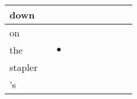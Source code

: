 \documentclass[landscape]{article}
\newcommand{\ssp}{\hspace{2pt}}
\newcommand{\mex}{\cellcolor{g}$\bullet$}
\begin{document}
\begin{tabular}{|l|p{10pt}|p{10pt}|p{10pt}|p{10pt}|p{10pt}|p{10pt}|p{10pt}|p{10pt}|p{10pt}|}
\hline
\ssp down \ssp&\hspace{2pt}&\hspace{2pt}&\hspace{2pt}&\hspace{2pt}&\hspace{2pt}&\hspace{2pt}&\hspace{2pt}&\hspace{2pt}&\hspace{2pt}\\
\hline
\ssp on \ssp&\hspace{2pt}&\hspace{2pt}&\hspace{2pt}&\hspace{2pt}&\hspace{2pt}&\hspace{2pt}&\hspace{2pt}&\hspace{2pt}&\hspace{2pt}\\
\hline
\ssp \cellcolor{ref1}the \ssp&\hspace{2pt}&\hspace{2pt}\mex&\hspace{2pt}&\hspace{2pt}&\hspace{2pt}&\hspace{2pt}&\hspace{2pt}&\hspace{2pt}&\hspace{2pt}\\
\hline
\ssp stapler \ssp&\hspace{2pt}&\hspace{2pt}&\hspace{2pt}&\hspace{2pt}&\hspace{2pt}&\hspace{2pt}&\hspace{2pt}&\hspace{2pt}&\hspace{2pt}\\
\hline
\ssp 's \ssp&\hspace{2pt}&\hspace{2pt}&\hspace{2pt}&\hspace{2pt}&\hspace{2pt}&\hspace{2pt}&\hspace{2pt}&\hspace{2pt}&\hspace{2pt}\\

\end{tabular}
\end{document}
